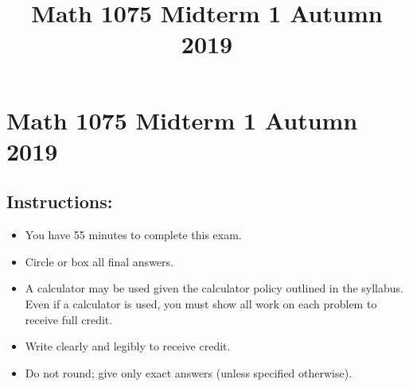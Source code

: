 \documentclass{ximera}
\title{Math 1075 Midterm 1 Autumn 2019}
\begin{document}
\section*{Math 1075 Midterm 1 Autumn 2019}

\subsection*{Instructions:}
\begin{itemize}
  \item You have 55 minutes to complete this exam.
  \item Circle or box all final answers.
  \item A calculator may be used given the calculator policy outlined in the syllabus. Even if a calculator is used, you must show all work on each problem to receive full credit.
  \item Write clearly and legibly to receive credit.
  \item Do not round; give only exact answers (unless specified otherwise).
\end{itemize}
\end{document}
